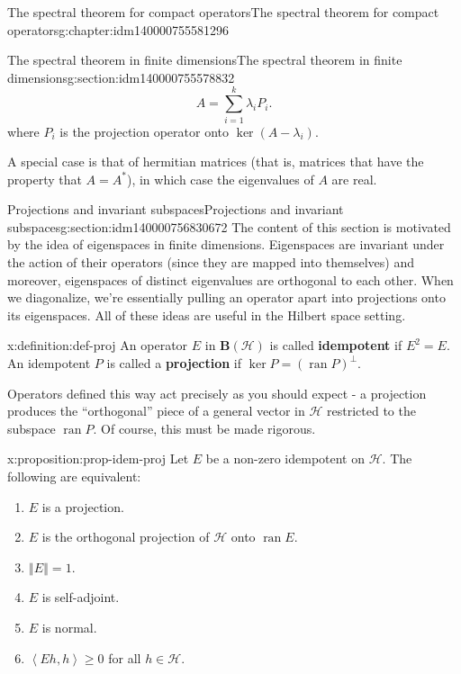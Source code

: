 \documentclass[oneside,10pt,]{book}
\newcommand{\terminology}[1]{\textbf{#1}}
\numberwithin{equation}{section}
\newcommand{\hilbert}{\mathcal{H}}
\newcommand{\BH}{\mathbf{B}(\mathcal{H})}
\newcommand{\norm}[1]{\left\Vert#1\right\Vert}
\newcommand{\ran}[1]{\operatorname{ran}#1}
\newcommand{\ip}[2]{\left\langle #1, #2 \right\rangle}
\newcommand{\ad}{^\ast}
\newcommand\la{\lambda}
\numberwithin{equation}{section}
\begin{document}
\begin{chapterptx}{The spectral theorem for compact operators}{}{The spectral theorem for compact operators}{}{}{g:chapter:idm140000755581296}
\begin{sectionptx}{The spectral theorem in finite dimensions}{}{The spectral theorem in finite dimensions}{}{}{g:section:idm140000755578832}
\begin{equation}
A = \sum_{i=1}^k \la_i P_{i}.\label{x:men:eq-finite-spec}
\end{equation}
where \(P_i\) is the projection operator onto \(\ker(A - \la_i)\).%
\par
A special case is that of hermitian matrices (that is, matrices that have the property that \(A = A\ad\)), in which case the eigenvalues of \(A\) are real.%
\end{sectionptx}
%
%
\typeout{************************************************}
\typeout{************************************************}
%
\begin{sectionptx}{Projections and invariant subspaces}{}{Projections and invariant subspaces}{}{}{g:section:idm140000756830672}
The content of this section is motivated by the idea of eigenspaces in finite dimensions. Eigenspaces are invariant under the action of their operators (since they are mapped into themselves) and moreover, eigenspaces of distinct eigenvalues are orthogonal to each other. When we diagonalize, we're essentially pulling an operator apart into projections onto its eigenspaces. All of these ideas are useful in the Hilbert space setting.%
\begin{definition}{}{x:definition:def-proj}%
An operator \(E\) in \(\BH\) is called \terminology{idempotent} if \(E^2 = E\). An idempotent \(P\) is called a \terminology{projection} if \(\ker P = (\ran P)^\perp\).%
\end{definition}
Operators defined this way act precisely as you should expect - a projection produces the ``orthogonal'' piece of a general vector in \(\hilbert\) restricted to the subspace \(\ran P\). Of course, this must be made rigorous.%
\begin{proposition}{}{}{x:proposition:prop-idem-proj}%
Let \(E\) be a non-zero idempotent on \(\hilbert\). The following are equivalent:%
\begin{enumerate}
\item{}\(E\) is a projection.%
\item{}\(E\) is the orthogonal projection of \(\hilbert\) onto \(\ran E\).%
\item{}\(\norm{E} = 1\).%
\item{}\(E\) is self-adjoint.%
\item{}\(E\) is normal.%
\item{}\(\ip{Eh}{h} \geq 0\) for all \(h \in \hilbert\).%
\end{enumerate}

\end{proposition}
\end{sectionptx}
\end{chapterptx}
\end{document}
